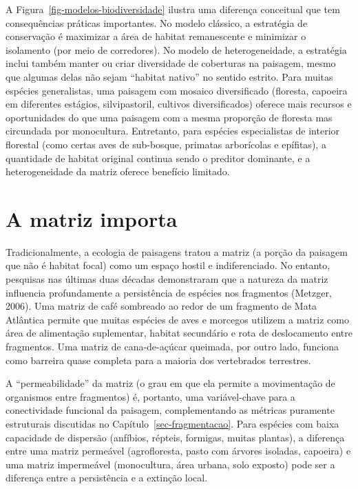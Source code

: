 \documentclass[
  portuguese,
  11pt,
  a4paper,
  open=any]{scrbook}
\begin{document}
A Figura~\ref{fig-modelos-biodiversidade} ilustra uma diferença
conceitual que tem consequências práticas importantes. No modelo
clássico, a estratégia de conservação é maximizar a área de habitat
remanescente e minimizar o isolamento (por meio de corredores). No
modelo de heterogeneidade, a estratégia inclui também manter ou criar
diversidade de coberturas na paisagem, mesmo que algumas delas não sejam
``habitat nativo'' no sentido estrito. Para muitas espécies
generalistas, uma paisagem com mosaico diversificado (floresta, capoeira
em diferentes estágios, silvipastoril, cultivos diversificados) oferece
mais recursos e oportunidades do que uma paisagem com a mesma proporção
de floresta mas circundada por monocultura. Entretanto, para espécies
especialistas de interior florestal (como certas aves de sub-bosque,
primatas arborícolas e epífitas), a quantidade de habitat original
continua sendo o preditor dominante, e a heterogeneidade da matriz
oferece benefício limitado.

\section{A matriz importa}\label{a-matriz-importa}

Tradicionalmente, a ecologia de paisagens tratou a matriz (a porção da
paisagem que não é habitat focal) como um espaço hostil e
indiferenciado. No entanto, pesquisas nas últimas duas décadas
demonstraram que a natureza da matriz influencia profundamente a
persistência de espécies nos fragmentos (Metzger, 2006). Uma matriz de
café sombreado ao redor de um fragmento de Mata Atlântica permite que
muitas espécies de aves e morcegos utilizem a matriz como área de
alimentação suplementar, habitat secundário e rota de deslocamento entre
fragmentos. Uma matriz de cana-de-açúcar queimada, por outro lado,
funciona como barreira quase completa para a maioria dos vertebrados
terrestres.

A ``permeabilidade'' da matriz (o grau em que ela permite a movimentação
de organismos entre fragmentos) é, portanto, uma variável-chave para a
conectividade funcional da paisagem, complementando as métricas
puramente estruturais discutidas no Capítulo~\ref{sec-fragmentacao}.
Para espécies com baixa capacidade de dispersão (anfíbios, répteis,
formigas, muitas plantas), a diferença entre uma matriz permeável
(agrofloresta, pasto com árvores isoladas, capoeira) e uma matriz
impermeável (monocultura, área urbana, solo exposto) pode ser a
diferença entre a persistência e a extinção local.
\end{document}
